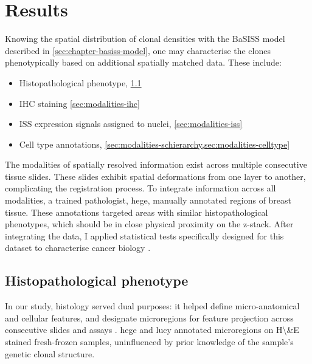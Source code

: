 \section{Results}

\label{sec:modalities-multimodal-results}

Knowing the spatial distribution of clonal densities with the BaSISS model described in \cref{sec:chapter-basiss-model}, one may characterise the clones phenotypically based on additional spatially matched data. These include:

\begin{itemize}
    \item Histopathological phenotype, \cref{sec:modalities-histopath}
    \item \ac{IHC} staining \cref{sec:modalities-ihc}
    \item \ac{ISS} expression signals assigned to nuclei, \cref{sec:modalities-iss}
    \item Cell type annotations, \cref{sec:modalities-schierarchy,sec:modalities-celltype}
\end{itemize}


The modalities of spatially resolved information exist across multiple consecutive tissue slides. These slides exhibit spatial deformations from one layer to another, complicating the registration process. To integrate information across all modalities, a trained pathologist, \acf{hege}, manually annotated regions of breast tissue. These annotations targeted areas with similar histopathological phenotypes, which should be in close physical proximity on the z-stack. After integrating the data, I applied statistical tests specifically designed for this dataset to characterise cancer biology .

\subsection{Histopathological phenotype}
\label{sec:modalities-histopath}

In our study, histology served dual purposes: it helped define micro-anatomical and cellular features, and designate microregions for feature projection across consecutive slides and assays . \acl{hege} and \acf{lucy} annotated microregions on \acf{H\&E} stained fresh-frozen samples, uninfluenced by prior knowledge of the sample's genetic clonal structure.

